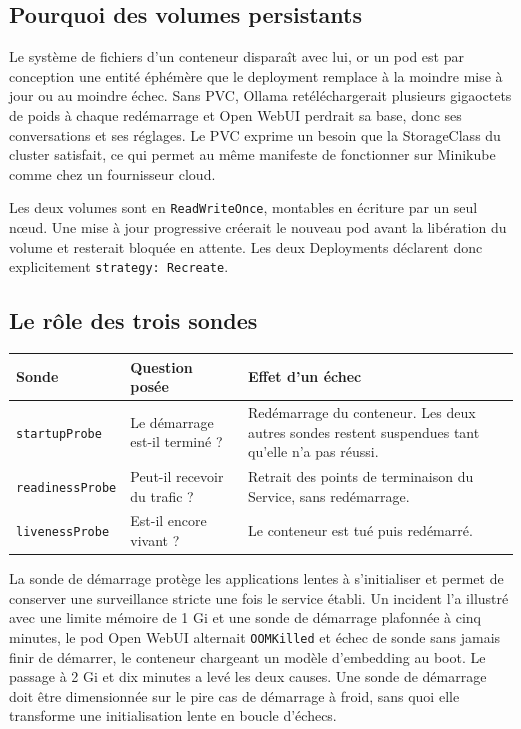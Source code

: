 \documentclass[10pt,a4paper]{article}
\begin{document}
\subsection{Pourquoi des volumes persistants}

Le système de fichiers d'un conteneur disparaît avec lui, or un pod est par
conception une entité éphémère que le deployment remplace à la moindre mise à
jour ou au moindre échec. Sans PVC, Ollama retéléchargerait plusieurs
gigaoctets de poids à chaque redémarrage et Open WebUI perdrait sa base, donc
ses conversations et ses réglages. Le PVC exprime un besoin que la StorageClass
du cluster satisfait, ce qui permet au même manifeste de fonctionner sur
Minikube comme chez un fournisseur cloud.

Les deux volumes sont en \texttt{ReadWriteOnce}, montables en écriture par un
seul n\oe ud. Une mise à jour progressive créerait le nouveau pod avant la
libération du volume et resterait bloquée en attente. Les deux Deployments
déclarent donc explicitement \texttt{strategy: Recreate}.

\subsection{Le rôle des trois sondes}

\begin{center}
\small
\renewcommand{\arraystretch}{1.02}
\begin{tabular}{
@{}
>{\raggedright\arraybackslash}p{2.25cm}
>{\raggedright\arraybackslash}p{4.2cm}
>{\raggedright\arraybackslash}p{8.6cm}
@{}}
\toprule
\textbf{Sonde} & \textbf{Question posée} & \textbf{Effet d'un échec} \\
\midrule
\texttt{startupProbe}
& Le démarrage est-il terminé ?
& Redémarrage du conteneur. Les deux autres sondes restent suspendues tant
qu'elle n'a pas réussi. \\

\texttt{readinessProbe}
& Peut-il recevoir du trafic ?
& Retrait des points de terminaison du Service, sans redémarrage. \\

\texttt{livenessProbe}
& Est-il encore vivant ?
& Le conteneur est tué puis redémarré. \\
\bottomrule
\end{tabular}
\end{center}

La sonde de démarrage protège les applications lentes à s'initialiser et permet
de conserver une surveillance stricte une fois le service établi. Un incident
l'a illustré avec une limite mémoire de 1 Gi et une sonde de démarrage
plafonnée à cinq minutes, le pod Open WebUI alternait \texttt{OOMKilled} et
échec de sonde sans jamais finir de démarrer, le conteneur chargeant un modèle
d'embedding au boot. Le passage à 2 Gi et dix minutes a levé les deux causes.
Une sonde de démarrage doit être dimensionnée sur le pire cas de démarrage à
froid, sans quoi elle transforme une initialisation lente en boucle d'échecs.
\end{document}
